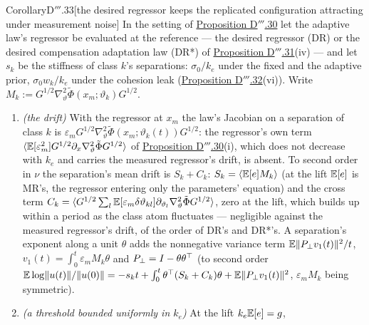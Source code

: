 \begin{thm}{Corollary}{D$'''$.33}[the desired regressor keeps the replicated configuration attracting under
measurement noise]\label{res:thmDppp:33}%
In the setting of \hyperref[res:thmDppp:30]{Proposition D$'''$.30} let the adaptive law's regressor be evaluated at
the reference --- the desired regressor (DR) or the desired compensation adaptation law (DR*) of
\hyperref[res:thmDppp:31]{Proposition D$'''$.31}(iv) --- and let $s_k$ be the stiffness of class $k$'s separations:
$\sigma_0/k_e$ under the fixed and the adaptive prior, $\sigma_0w_k/k_e$ under the cohesion leak
(\hyperref[res:thmDppp:32]{Proposition D$'''$.32}(vi)). Write
$M_k := G^{1/2}\nabla^2_\vartheta\tilde\Phi(x_m;\vartheta_k)G^{1/2}$.
\begin{enumerate}[label=\textup{(\roman*)}]
  \item \emph{(the drift)} With the regressor at $x_m$ the law's Jacobian on a separation of class $k$ is
    $\varepsilon_mG^{1/2}\nabla^2_\vartheta\tilde\Phi(x_m;\vartheta_k(t))G^{1/2}$: the regressor's own term
    $\langle\mathbb{E}[\varepsilon_m^2]G^{1/2}\partial_x\nabla^2_\vartheta\tilde\Phi G^{1/2}\rangle$ of
    \hyperref[res:thmDppp:30]{Proposition D$'''$.30}(i), which does not decrease with $k_e$ and carries the measured
    regressor's drift, is absent. To second order in $\nu$ the separation's mean drift is $S_k + C_k$:
    $S_k = \langle\mathbb{E}[e]M_k\rangle$ (at the lift $\mathbb{E}[e]$ is MR's, the regressor entering only the parameters'
    equation) and the cross term
    $C_k = \langle G^{1/2}\sum_l\mathbb{E}[\varepsilon_m\delta\vartheta_{kl}]\partial_{\vartheta_l}\nabla^2_\vartheta\tilde\Phi G^{1/2}\rangle$,
    zero at the lift, which builds up within a period as the class atom fluctuates --- negligible against the
    measured regressor's drift, of the order of DR's and DR*'s. A separation's exponent along a unit $\theta$ adds the
    nonnegative variance term $\mathbb{E}\lVert P_\perp v_1(t)\rVert^2/t$, $v_1(t) = \int_0^t\varepsilon_mM_k\theta$ and
    $P_\perp = I - \theta\theta^\top$ (to second order
    $\mathbb{E}\log\lVert u(t)\rVert/\lVert u(0)\rVert = -s_kt + \int_0^t\theta^\top(S_k + C_k)\theta + \mathbb{E}\lVert P_\perp v_1(t)\rVert^2$,
    $\varepsilon_mM_k$ being symmetric).
  \item \emph{(a threshold bounded uniformly in $k_e$)} At the lift $k_e\mathbb{E}[e] = g$,

\end{enumerate}
\end{thm}
